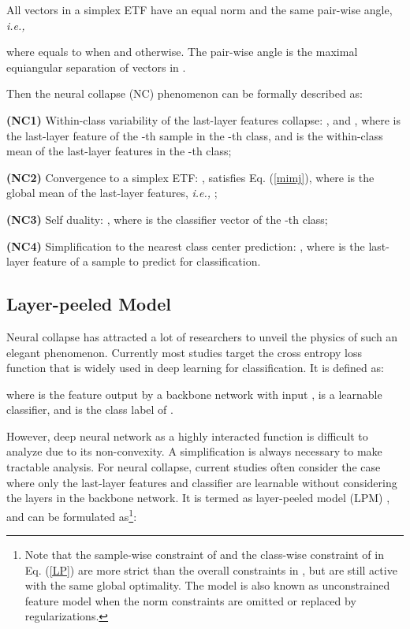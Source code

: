 \documentclass{article}
\newcommand{\<}{\left\langle}
\renewcommand{\>}{\right\rangle}
\begin{document}
All vectors in a simplex ETF have an equal  norm and the same pair-wise angle, \emph{i.e.,}

where  equals to  when  and  otherwise. The pair-wise angle  is the maximal equiangular separation of  vectors in  \cite{papyan2020prevalence}. 


Then the neural collapse (NC) phenomenon can be formally described as:



\textbf{(NC1)} Within-class variability of the last-layer features collapse: , and , where  is the last-layer feature of the -th sample in the -th class, and  is the within-class mean of the last-layer features in the -th class;

\textbf{(NC2)} Convergence to a simplex ETF: , satisfies Eq. (\ref{mimj}), where   is the global mean of the last-layer features, \emph{i.e.,} ;

\textbf{(NC3)} Self duality: , where  is the classifier vector of the -th class;

\textbf{(NC4)} Simplification to the nearest class center prediction: , where  is the last-layer feature of a sample to predict for classification.


\subsection{Layer-peeled Model}

Neural collapse has attracted a lot of researchers to unveil the physics of such an elegant phenomenon. Currently most studies target the cross entropy loss function that is widely used in deep learning for classification. It is defined as:

where  is the feature output by a  backbone network with input ,  is a learnable classifier, and  is the class label of . 

However, deep neural network as a highly interacted function is difficult to analyze due to its non-convexity. A simplification is always necessary to make tractable analysis. For neural collapse, current studies often consider the case where only the last-layer features and classifier are learnable without considering the layers in the backbone network. It is termed as layer-peeled model (LPM) \cite{fang2021exploring}, and can be formulated as\footnote{Note that the sample-wise constraint of  and the class-wise constraint of  in Eq. (\ref{LP}) are more strict than the overall constraints in \cite{fang2021exploring}, but are still active with the same global optimality. The model is also known as unconstrained feature model \cite{mixon2020neural,zhu2021geometric} when the norm constraints are omitted or replaced by regularizations.}:
\end{document}
